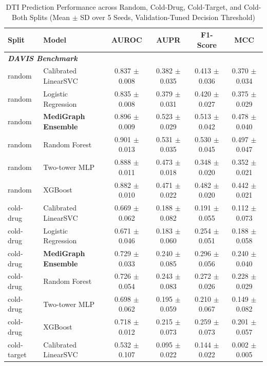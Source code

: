 \begin{table}[t]
\centering
\caption{DTI Prediction Performance across Random, Cold-Drug, Cold-Target, and Cold-Both Splits (Mean $\pm$ SD over 5 Seeds, Validation-Tuned Decision Threshold)}\n\label{tab:dti_main}
\small
\begin{tabular}{llcccc}
\hline
\textbf{Split} & \textbf{Model} & \textbf{AUROC} & \textbf{AUPR} & \textbf{F1-Score} & \textbf{MCC} \\
\hline
\multicolumn{6}{l}{\textit{\textbf{DAVIS Benchmark}}} \\
\hline
random & Calibrated LinearSVC & 0.837 $\pm$ 0.008 & 0.382 $\pm$ 0.035 & 0.413 $\pm$ 0.036 & 0.370 $\pm$ 0.034 \\
random & Logistic Regression & 0.835 $\pm$ 0.008 & 0.379 $\pm$ 0.031 & 0.420 $\pm$ 0.027 & 0.375 $\pm$ 0.029 \\
random & \textbf{MediGraph Ensemble} & 0.896 $\pm$ 0.009 & 0.523 $\pm$ 0.029 & 0.513 $\pm$ 0.042 & 0.478 $\pm$ 0.040 \\
random & Random Forest & 0.901 $\pm$ 0.013 & 0.531 $\pm$ 0.035 & 0.530 $\pm$ 0.045 & 0.497 $\pm$ 0.047 \\
random & Two-tower MLP & 0.888 $\pm$ 0.011 & 0.473 $\pm$ 0.018 & 0.348 $\pm$ 0.020 & 0.352 $\pm$ 0.021 \\
random & XGBoost & 0.882 $\pm$ 0.010 & 0.471 $\pm$ 0.022 & 0.482 $\pm$ 0.020 & 0.442 $\pm$ 0.021 \\
\hline
cold-drug & Calibrated LinearSVC & 0.669 $\pm$ 0.062 & 0.188 $\pm$ 0.082 & 0.191 $\pm$ 0.055 & 0.112 $\pm$ 0.073 \\
cold-drug & Logistic Regression & 0.671 $\pm$ 0.046 & 0.183 $\pm$ 0.060 & 0.254 $\pm$ 0.051 & 0.188 $\pm$ 0.058 \\
cold-drug & \textbf{MediGraph Ensemble} & 0.729 $\pm$ 0.033 & 0.240 $\pm$ 0.085 & 0.296 $\pm$ 0.056 & 0.240 $\pm$ 0.040 \\
cold-drug & Random Forest & 0.726 $\pm$ 0.054 & 0.243 $\pm$ 0.083 & 0.272 $\pm$ 0.026 & 0.228 $\pm$ 0.029 \\
cold-drug & Two-tower MLP & 0.698 $\pm$ 0.062 & 0.195 $\pm$ 0.059 & 0.210 $\pm$ 0.067 & 0.149 $\pm$ 0.082 \\
cold-drug & XGBoost & 0.718 $\pm$ 0.012 & 0.215 $\pm$ 0.073 & 0.259 $\pm$ 0.073 & 0.201 $\pm$ 0.057 \\
\hline
cold-target & Calibrated LinearSVC & 0.532 $\pm$ 0.107 & 0.095 $\pm$ 0.022 & 0.144 $\pm$ 0.022 & 0.002 $\pm$ 0.005 \\

\end{tabular}
\end{table}
